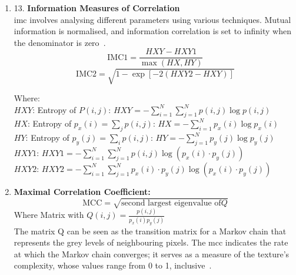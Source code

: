 \begin{enumerate}
    \item 13. \textbf{Information Measures of Correlation}\\
    \acf{imc} involves analysing different parameters using various techniques. Mutual information is normalised, and information correlation is set to infinity when the denominator is zero~\cite{oprisan_bounds_2023}.
        \begin{equation}
            \text{IMC1} = \frac{HXY - HXY1}{\max(HX, HY)}
        \end{equation}
        \begin{equation}
            \text{IMC2} = \sqrt{1 - \exp[-2(HXY2 - HXY)]}
        \end{equation}

    Where: \\
        $HXY$: Entropy of $P(i,j)$: $HXY = - \sum_{i=1}^{N} \sum_{j=1}^{N} p(i,j) \log p(i,j)$ \\
        $HX$: Entropy of $p_x(i) = \sum_{j} p(i,j)$: $HX = -    \sum_{i=1}^{N} p_x(i) \log p_x(i)$ \\
        $HY$: Entropy of $p_y(j) = \sum_{i} p(i,j)$: $HY = - \sum_{j=1}^{N} p_y(j) \log p_y(j)$ \\
        $HXY1$: $HXY1 = - \sum_{i=1}^{N} \sum_{j=1}^{N} p(i,j) \log \left( p_x(i) \cdot p_y(j) \right)$ \\
        $HXY2$: $HXY2 = - \sum_{i=1}^{N} \sum_{j=1}^{N} p_x(i) \cdot p_y(j) \log \left( p_x(i) \cdot p_y(j) \right)$ \\
    \setcounter{enumi}{13}
    
    \item \textbf{Maximal Correlation Coefficient:}\\
        \begin{equation}
            \text{MCC} = \sqrt{\text{second largest eigenvalue of} Q}
        \end{equation}
    Where Matrix with $Q(i,j) = \frac{p(i,j)}{p_x(i)p_y(j)}$ \\
    
    The matrix Q can be seen as the transition matrix for a Markov chain that represents the grey levels of neighbouring pixels. The \acf{mcc} indicates the rate at which the Markov chain converges; it serves as a measure of the texture's complexity, whose values range from 0 to 1, inclusive~\cite{oprisan_bounds_2023}.
\end{enumerate}



